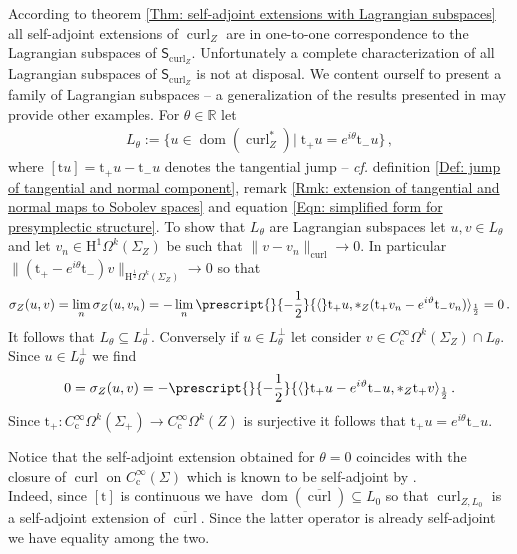 \begin{Example}
	According to theorem \ref{Thm: self-adjoint extensions with Lagrangian subspaces} all self-adjoint extensions of $\operatorname{curl}_Z$ are in one-to-one correspondence to the Lagrangian subspaces of $\mathsf{S}_{\operatorname{curl}_Z}$.
	Unfortunately a complete characterization of all Lagrangian subspaces of $\mathsf{S}_{\operatorname{curl}_Z}$ is not at disposal.
	We content ourself to present a family of Lagrangian subspaces -- a generalization of the results presented in \cite{Hiptmair-Kotiuga-Tordeux-12} may provide other examples.
	For $\theta\in\mathbb{R}$ let
	\begin{align}
		L_{\theta}:=\lbrace
		u\in\operatorname{dom}(\operatorname{curl}_Z^*)|\;\mathrm{t}_+u=e^{i\theta}\mathrm{t}_-u\rbrace\,,
	\end{align}
	where $[\mathrm{t}u]=\mathrm{t}_+u-\mathrm{t}_-u$ denotes the tangential jump -- \textit{cf.} definition \ref{Def: jump of tangential and normal component}, remark \ref{Rmk: extension of tangential and normal maps to Sobolev spaces} and equation \eqref{Eqn: simplified form for presymplectic structure}.
	To show that $L_\theta$ are Lagrangian subspaces let $u,v\in L_\theta$ and let $v_n\in\mathrm{H}^1\Omega^k(\Sigma_Z)$ be such that $\|v-v_n\|_{\operatorname{curl}}\to 0$.
	In particular $\|(\mathrm{t}_+-e^{i\theta}\mathrm{t}_-) v\|_{\mathrm{H}^{\frac{1}{2}}\Omega^k(\Sigma_Z)}\to 0$ so that
	\begin{align}
		\sigma_Z(u,v)=
		\lim_n\sigma_Z(u,v_n)=
		-\lim_n
		\prescript{}{-\frac{1}{2}}{\langle}\mathrm{t}_+u,\ast_Z(\mathrm{t}_+v_n-e^{i\theta}\mathrm{t}_-v_n)\rangle_{\frac{1}{2}}=0\,.
	\end{align}
	It follows that $L_\theta\subseteq L_\theta^\perp$.
	Conversely if $u\in L_\theta^\perp$ let consider $v\in C^\infty_{\mathrm{c}}\Omega^k(\Sigma_Z)\cap L_\theta$.
	Since $u\in L_\theta^\perp$ we find
	\begin{align*}
		0=\sigma_Z(u,v)=
		-\prescript{}{-\frac{1}{2}}{\langle}\mathrm{t}_+u-e^{i\theta}\mathrm{t}_-u,\ast_Z\mathrm{t}_+v\rangle_{\frac{1}{2}}\,.	
	\end{align*}
	Since $\mathrm{t}_+\colon C^\infty_{\mathrm{c}}\Omega^k(\Sigma_+)\to C^\infty_{\mathrm{c}}\Omega^k(Z)$ is surjective it follows that $\mathrm{t}_+u=e^{i\theta}\mathrm{t}_-u$.

	Notice that the self-adjoint extension obtained for $\theta=0$ coincides with the closure of $\operatorname{curl}$ on $C^\infty_{\mathrm{c}}(\Sigma)$ which is known to be self-adjoint by \cite[Lem. 2.6]{Baer-19}.
	\\
	Indeed, since $[\mathrm{t}]$ is continuous we have $\operatorname{dom}(\overline{\operatorname{curl}})\subseteq L_{0}$ so that $\operatorname{curl}_{Z,L_0}$ is a self-adjoint extension of $\overline{\operatorname{curl}}$.
	Since the latter operator is already self-adjoint we have equality among the two.
\end{Example}


